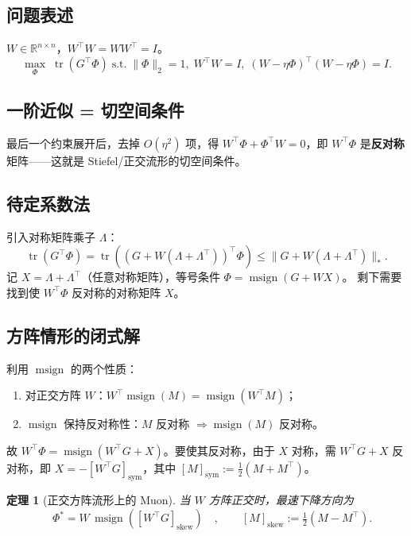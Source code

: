 \documentclass[11pt,a4paper]{article}
\theoremstyle{mythm}
\newtheorem{theorem}{定理}[section]
\theoremstyle{mydef}
\newcommand{\R}{\mathbb{R}}
\newcommand{\tr}{\operatorname{tr}}
\newcommand{\msign}{\operatorname{msign}}
\newcommand{\nuc}{\ast}
\begin{document}
\subsection{问题表述}
$W\in\R^{n\times n}$，$W^\top W = WW^\top = I$。
\begin{equation}\label{eq:orth-prob}
\max_\Phi\;\tr(G^\top \Phi)\;\text{s.t.}\;\|\Phi\|_2=1,\;W^\top W = I,\;(W-\eta\Phi)^\top(W-\eta\Phi)=I.
\end{equation}

\subsection{一阶近似 = 切空间条件}
最后一个约束展开后，去掉 $O(\eta^2)$ 项，得
$W^\top \Phi + \Phi^\top W = 0$，即 $W^\top \Phi$ 是\textbf{反对称}矩阵——这就是 Stiefel/正交流形的切空间条件。

\subsection{待定系数法}
引入对称矩阵乘子 $\Lambda$：
$$\tr(G^\top\Phi) = \tr((G+W(\Lambda+\Lambda^\top))^\top \Phi) \le \|G+W(\Lambda+\Lambda^\top)\|_\nuc.$$
记 $X = \Lambda+\Lambda^\top$（任意对称矩阵），等号条件
$\Phi = \msign(G + WX)$。
剩下需要找到使 $W^\top\Phi$ 反对称的对称矩阵 $X$。

\subsection{方阵情形的闭式解}
利用 $\msign$ 的两个性质：
\begin{enumerate}[leftmargin=2em]
\item 对正交方阵 $W$：$W^\top \msign(M) = \msign(W^\top M)$；
\item $\msign$ 保持反对称性：$M$ 反对称 $\Rightarrow \msign(M)$ 反对称。
\end{enumerate}
故 $W^\top\Phi = \msign(W^\top G + X)$。要使其反对称，由于 $X$ 对称，需 $W^\top G + X$ 反对称，即
$X = -[W^\top G]_{\mathrm{sym}}$，其中 $[M]_{\mathrm{sym}}:=\tfrac{1}{2}(M+M^\top)$。

\begin{theorem}[正交方阵流形上的 Muon]\label{thm:orth-square}
当 $W$ 方阵正交时，最速下降方向为
\begin{equation}
\boxed{\quad\Phi^\ast = W\,\msign\!\left([W^\top G]_{\mathrm{skew}}\right)\quad,\qquad
[M]_{\mathrm{skew}}:=\tfrac{1}{2}(M-M^\top).}
\end{equation}
\end{theorem}
\end{document}
